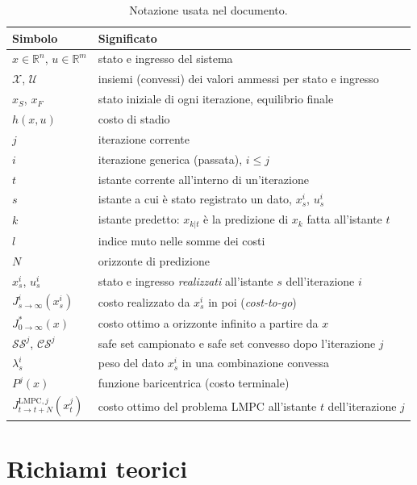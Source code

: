 \documentclass[11pt,a4paper]{article}
\theoremstyle{definition}
\theoremstyle{plain}
\theoremstyle{remark}
\newcommand{\R}{\mathbb{R}}
\newcommand{\Xc}{\mathcal{X}}
\newcommand{\Uc}{\mathcal{U}}
\newcommand{\SSet}{\mathcal{SS}}
\newcommand{\CS}{\mathcal{CS}}
\newcommand{\JLt}{J^{\mathrm{LMPC},j}_{t\to t+N}}
\newcommand{\Jstar}{J^{*}_{0\to\infty}}
\begin{document}
\begin{table}[h]
\centering
\caption{Notazione usata nel documento.}\label{tab:notazione}
\begin{tabular}{ll}
\toprule
Simbolo & Significato \\
\midrule
$x\in\R^n$, $u\in\R^m$ & stato e ingresso del sistema \\
$\Xc$, $\Uc$ & insiemi (convessi) dei valori ammessi per stato e ingresso \\
$x_S$, $x_F$ & stato iniziale di ogni iterazione, equilibrio finale \\
$h(x,u)$ & costo di stadio \\
$j$ & iterazione corrente \\
$i$ & iterazione generica (passata), $i\le j$ \\
$t$ & istante corrente all'interno di un'iterazione \\
$s$ & istante a cui è stato registrato un dato, $x^i_s$, $u^i_s$ \\
$k$ & istante predetto: $x_{k|t}$ è la predizione di $x_k$ fatta all'istante $t$ \\
$l$ & indice muto nelle somme dei costi \\
$N$ & orizzonte di predizione \\
$x^i_s$, $u^i_s$ & stato e ingresso \emph{realizzati} all'istante $s$ dell'iterazione $i$ \\
$J^i_{s\to\infty}(x^i_s)$ & costo realizzato da $x^i_s$ in poi (\emph{cost-to-go}) \\
$\Jstar(x)$ & costo ottimo a orizzonte infinito a partire da $x$ \\
$\SSet^j$, $\CS^j$ & safe set campionato e safe set convesso dopo l'iterazione $j$ \\
$\lambda^i_s$ & peso del dato $x^i_s$ in una combinazione convessa \\
$P^j(x)$ & funzione baricentrica (costo terminale) \\
$\JLt(x^j_t)$ & costo ottimo del problema LMPC all'istante $t$ dell'iterazione $j$ \\
\bottomrule
\end{tabular}
\end{table}

\section{Richiami teorici}\label{sec:richiami}
\end{document}
